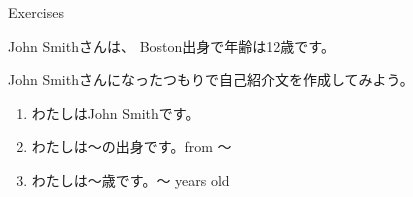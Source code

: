 \documentclass[aspectratio=169,xcolor={dvipsnames,table}]{beamer}
\newcommand{\myaudio}[1]{\href{#1}{\faVolumeUp}}
\begin{document}
%
%
%
%
%
%
%
%
%
%
%
%  
\begin{frame}[plain]{Exercises}

John Smithさんは、
Boston出身で年齢は12歳です。

John Smithさんになったつもりで自己紹介文を作成してみよう。

\begin{enumerate}
 \item わたしはJohn Smithです。
 \item わたしは〜の出身です。\hfill{}from 〜
 \item わたしは〜歳です。\hfill{}〜 years old
\end{enumerate}

\end{frame}
\end{document}
